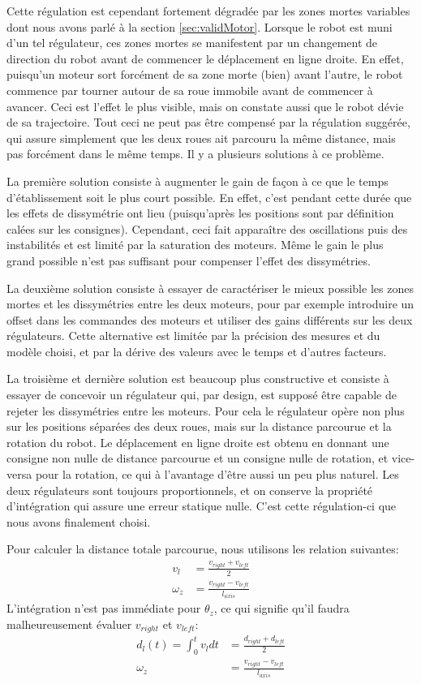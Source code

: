 Cette régulation est cependant fortement dégradée par les zones mortes variables dont nous avons parlé à la section \ref{sec:validMotor}. Lorsque le robot est muni d'un tel régulateur, ces zones mortes se manifestent par un changement de direction du robot avant de commencer le déplacement en ligne droite. En effet, puisqu'un moteur sort forcément de sa zone morte (bien) avant l'autre, le robot commence par tourner autour de sa roue immobile avant de commencer à avancer. Ceci est l'effet le plus visible, mais on constate aussi que le robot dévie de sa trajectoire. Tout ceci ne peut pas être compensé par la régulation suggérée, qui assure simplement que les deux roues ait parcouru la même distance, mais pas forcément dans le même temps. Il y a plusieurs solutions à ce problème.

La première solution consiste à augmenter le gain de façon à ce que le temps d'établissement soit le plus court possible. En effet, c'est pendant cette durée que les effets de dissymétrie ont lieu (puisqu'après les positions sont par définition calées sur les consignes). Cependant, ceci fait apparaître des oscillations puis des instabilités et est limité par la saturation des moteurs. Même le gain le plus grand possible n'est pas suffisant pour compenser l'effet des dissymétries.

La deuxième solution consiste à essayer de caractériser le mieux possible les zones mortes et les dissymétries entre les deux moteurs, pour par exemple introduire un offset dans les commandes des moteurs et utiliser des gains différents sur les deux régulateurs. Cette alternative est limitée par la précision des mesures et du modèle choisi, et par la dérive des valeurs avec le temps et d'autres facteurs.

La troisième et dernière solution est beaucoup plus constructive et consiste à essayer de concevoir un régulateur qui, par design, est supposé être capable de rejeter les dissymétries entre les moteurs. Pour cela le régulateur opère non plus sur les positions séparées des deux roues, mais sur la distance parcourue et la rotation du robot. Le déplacement en ligne droite est obtenu en donnant une consigne non nulle de distance parcourue et un consigne nulle de rotation, et vice-versa pour la rotation, ce qui à l'avantage d'être aussi un peu plus naturel. Les deux régulateurs sont toujours proportionnels, et on conserve la propriété d'intégration qui assure une erreur statique nulle. C'est cette régulation-ci que nous avons finalement choisi.

Pour calculer la distance totale parcourue, nous utilisons les relation suivantes:
\begin{align*}
  v_l &= \frac{v_{right}+v_{left}}{2}\\
  \omega_z &= \frac{v_{right} - v_{left}}{l_{axis}}
\end{align*}
L'intégration n'est pas immédiate pour $\theta_z$, ce qui signifie qu'il faudra malheureusement évaluer $v_{right}$ et $v_{left}$:
\begin{align*}
  d_l(t) = \int_0^tv_l dt &= \frac{d_{right}+d_{left}}{2}\\
  \omega_z &= \frac{v_{right} - v_{left}}{l_{axis}}
\end{align*}